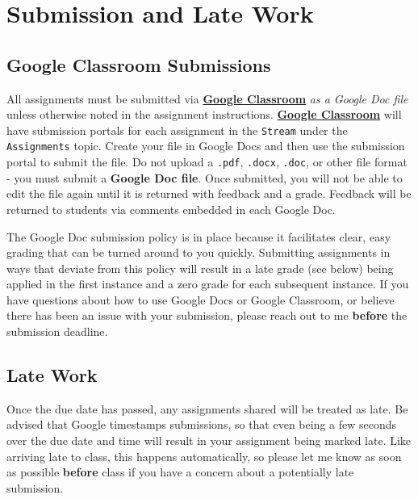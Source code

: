\documentclass[]{book}
\theoremstyle{definition}
\theoremstyle{definition}
\theoremstyle{definition}
\theoremstyle{remark}
\begin{document}
\hypertarget{submission-and-late-work}{%
\section{Submission and Late Work}\label{submission-and-late-work}}

\hypertarget{google-classroom-submissions}{%
\subsection{Google Classroom
Submissions}\label{google-classroom-submissions}}

All assignments must be submitted via
\textbf{\href{https://classroom.google.com}{Google Classroom}} \emph{as
a Google Doc file} unless otherwise noted in the assignment
instructions. \textbf{\href{https://classroom.google.com}{Google
Classroom}} will have submission portals for each assignment in the
\texttt{Stream} under the \texttt{Assignments} topic. Create your file
in Google Docs and then use the submission portal to submit the file. Do
not upload a \texttt{.pdf}, \texttt{.docx}, \texttt{.doc}, or other file
format - you must submit a \textbf{Google Doc file}. Once submitted, you
will not be able to edit the file again until it is returned with
feedback and a grade. Feedback will be returned to students via comments
embedded in each Google Doc.

The Google Doc submission policy is in place because it facilitates
clear, easy grading that can be turned around to you quickly. Submitting
assignments in ways that deviate from this policy will result in a late
grade (see below) being applied in the first instance and a zero grade
for each subsequent instance. If you have questions about how to use
Google Docs or Google Classroom, or believe there has been an issue with
your submission, please reach out to me \textbf{before} the submission
deadline.

\hypertarget{late-work}{%
\subsection{Late Work}\label{late-work}}

Once the due date has passed, any assignments shared will be treated as
late. Be advised that Google timestamps submissions, so that even being
a few seconds over the due date and time will result in your assignment
being marked late. Like arriving late to class, this happens
automatically, so please let me know as soon as possible \textbf{before}
class if you have a concern about a potentially late submission.
\end{document}
